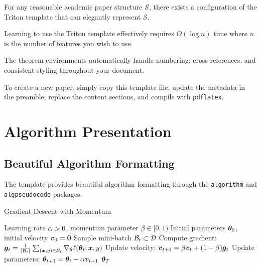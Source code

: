 \documentclass{triton}
\begin{document}
\begin{theorem}
For any reasonable academic paper structure $\mathcal{S}$, there exists a configuration of the Triton template that can elegantly represent $\mathcal{S}$.
\end{theorem}

\begin{lemma}
Learning to use the Triton template effectively requires $O(\log n)$ time where $n$ is the number of features you wish to use.
\end{lemma}

\begin{remark}
The theorem environments automatically handle numbering, cross-references, and consistent styling throughout your document.
\end{remark}

\begin{example}
To create a new paper, simply copy this template file, update the metadata in the preamble, replace the content sections, and compile with \texttt{pdflatex}.
\end{example}

\section{Algorithm Presentation}

\subsection{Beautiful Algorithm Formatting}

The template provides beautiful algorithm formatting through the \texttt{algorithm} and \texttt{algpseudocode} packages:

\begin{algorithm}[h]
\caption{Gradient Descent with Momentum}
\label{alg:momentum}
\begin{algorithmic}[1]
  \Require Learning rate $\alpha > 0$, momentum parameter $\beta \in [0,1)$
  \Require Initial parameters ${\bm{\theta}}_0$, initial velocity ${\bm{v}}_0 = {\bm{0}}$
    \State Sample mini-batch $\mathcal{B}_t \subset \mathcal{D}$
    \State Compute gradient: ${\bm{g}}_t = \frac{1}{|\mathcal{B}_t|} \sum_{({\bm{x}},y) \in \mathcal{B}_t} \nabla_{{\bm{\theta}}} \ell({\bm{\theta}}_t; {\bm{x}}, y)$
    \State Update velocity: ${\bm{v}}_{t+1} = \beta {\bm{v}}_t + (1-\beta) {\bm{g}}_t$
    \State Update parameters: ${\bm{\theta}}_{t+1} = {\bm{\theta}}_t - \alpha {\bm{v}}_{t+1}$
  \EndFor
  \State \Return ${\bm{\theta}}_T$
\end{algorithmic}
\end{algorithm}
\end{document}
